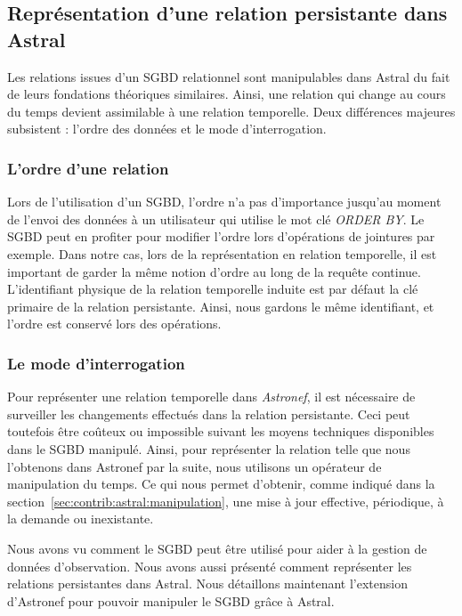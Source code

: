 \subsection{Représentation d'une relation persistante dans Astral}\label{sec:contrib:asteroid:theorie:astral}
Les relations issues d'un SGBD relationnel sont manipulables dans Astral du fait de leurs fondations théoriques similaires. Ainsi, une relation qui change au cours du temps devient assimilable à une relation temporelle. Deux différences majeures subsistent : l'ordre des données et le mode d'interrogation.
\subsubsection{L'ordre d'une relation}
Lors de l'utilisation d'un SGBD, l'ordre n'a pas d'importance jusqu'au moment de l'envoi des données à un utilisateur qui utilise le mot clé \textit{ORDER BY}. Le SGBD peut en profiter pour modifier l'ordre lors d'opérations de jointures par exemple. Dans notre cas, lors de la représentation en relation temporelle, il est important de garder la même notion d'ordre au long de la requête continue. L'identifiant physique de la relation temporelle induite est par défaut la clé primaire de la relation persistante. Ainsi, nous gardons le même identifiant, et l'ordre est conservé lors des opérations.

\subsubsection{Le mode d'interrogation}
Pour représenter une relation temporelle dans \textit{Astronef}, il est nécessaire de surveiller les changements effectués dans la relation persistante. Ceci peut toutefois être coûteux ou impossible suivant les moyens techniques disponibles dans le SGBD manipulé. Ainsi, pour représenter la relation telle que nous l'obtenons dans Astronef par la suite, nous utilisons un opérateur de manipulation du temps. Ce qui nous permet d'obtenir, comme indiqué dans la section~\ref{sec:contrib:astral:manipulation}, une mise à jour effective, périodique, à la demande ou inexistante.

Nous avons vu comment le SGBD peut être utilisé pour aider à la gestion de données d'observation. Nous avons aussi présenté comment représenter les relations persistantes dans Astral. Nous détaillons maintenant l'extension d'Astronef pour pouvoir manipuler le SGBD grâce à Astral.